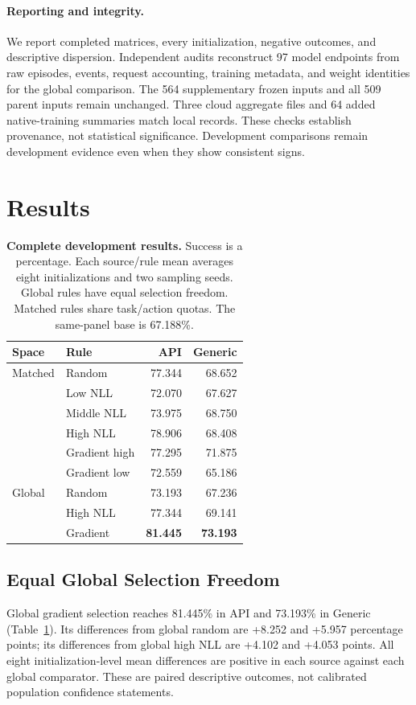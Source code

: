\documentclass{article}
\begin{document}
\paragraph{Reporting and integrity.} We report completed matrices, every initialization, negative outcomes, and descriptive dispersion. Independent audits reconstruct 97 model endpoints from raw episodes, events, request accounting, training metadata, and weight identities for the global comparison. The 564 supplementary frozen inputs and all 509 parent inputs remain unchanged. Three cloud aggregate files and 64 added native-training summaries match local records. These checks establish provenance, not statistical significance. Development comparisons remain development evidence even when they show consistent signs.

\section{Results}
\begin{table}[t]
\centering\small
\caption{\textbf{Complete development results.} Success is a percentage. Each source/rule mean averages eight initializations and two sampling seeds. Global rules have equal selection freedom. Matched rules share task/action quotas. The same-panel base is 67.188\%.}
\label{tab:main}
\begin{tabular}{llrr}\toprule
Space & Rule & API & Generic\\\midrule
Matched & Random & 77.344 & 68.652\\
& Low NLL & 72.070 & 67.627\\
& Middle NLL & 73.975 & 68.750\\
& High NLL & 78.906 & 68.408\\
& Gradient high & 77.295 & 71.875\\
& Gradient low & 72.559 & 65.186\\\midrule
Global & Random & 73.193 & 67.236\\
& High NLL & 77.344 & 69.141\\
& Gradient & \textbf{81.445} & \textbf{73.193}\\\bottomrule
\end{tabular}
\end{table}

\subsection{Equal Global Selection Freedom}
Global gradient selection reaches 81.445\% in API and 73.193\% in Generic (Table~\ref{tab:main}). Its differences from global random are +8.252 and +5.957 percentage points; its differences from global high NLL are +4.102 and +4.053 points. All eight initialization-level mean differences are positive in each source against each global comparator. These are paired descriptive outcomes, not calibrated population confidence statements.
\end{document}
